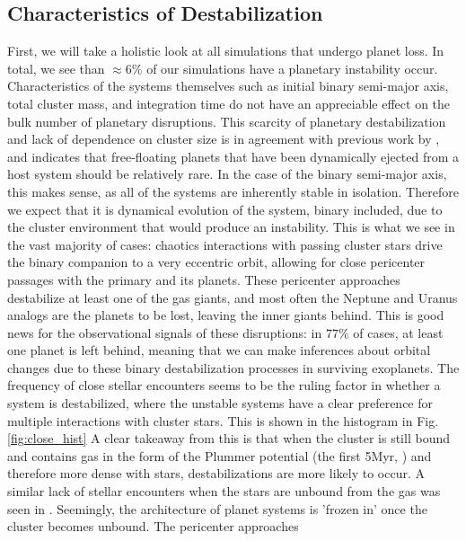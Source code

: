 \documentclass[manuscript]{aastex631}
\begin{document}
\subsection{Characteristics of Destabilization}
First, we will take a holistic look at all simulations that undergo planet loss. In total, we see than $\approx 6\%$ of our simulations
have a planetary instability occur. Characteristics of the systems themselves such 
as initial binary semi-major axis, total cluster mass, and integration time do not have an appreciable effect on the bulk number of 
planetary disruptions. This scarcity of planetary destabilization and lack of dependence
on cluster size is in agreement with previous work by \cite{dlfm99}, and indicates that free-floating
planets that have been dynamically ejected from a host system should be relatively rare. 
 In the case of the binary semi-major axis, this makes sense, as all of the systems are inherently stable in 
isolation. Therefore we expect that it is dynamical evolution of the system, binary included, due to the cluster environment that 
would produce an instability. This is what we see in the vast majority of cases: chaotics interactions with passing cluster stars 
drive the binary companion to a very eccentric orbit, allowing for close pericenter passages with the primary and its planets. 
These pericenter approaches destabilize at least one of the gas giants, and most often the Neptune and Uranus analogs are the planets 
to be lost, leaving the inner giants behind. This is good news for the observational signals of these disruptions: in $77\%$ of cases, 
at least one planet is left behind, meaning that we can make inferences about orbital changes due to these binary destabilization processes 
in surviving exoplanets. The frequency of close stellar encounters seems to be the ruling factor in whether a system is destabilized,
where the unstable systems have a clear preference for multiple interactions with cluster stars. This is shown in the histogram in Fig.\ref{fig:close_hist}
A clear takeaway from this is that when the cluster is still bound and contains gas 
in the form of the Plummer potential (the first 5Myr, \cite{all07}) and therefore more dense with stars, destabilizations are more likely to occur. A similar
lack of stellar encounters when the stars are unbound from the gas was seen in \cite{ada06}.
Seemingly, the architecture of planet systems is 'frozen in' once the cluster becomes unbound. The pericenter approaches 
\end{document}
